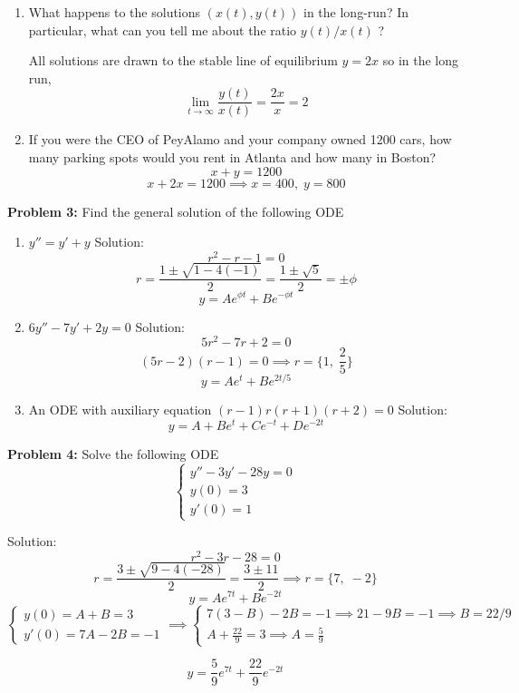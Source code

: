\documentclass[12pt]{article}
\begin{document}
\begin{enumerate}
    \item What happens to the solutions $(x(t), y(t))$ in the long-run? In particular, what can you tell me about the ratio $y(t)/x(t)$ ?
    
    All solutions are drawn to the stable line of equilibrium $y = 2x$ so in the long run,
    \[\lim_{t \to \infty} \frac{y(t)}{x(t)} = \frac{2x}{x} = \boxed{2}\]
    
    \item If you were the CEO of PeyAlamo and your company owned 1200 cars, how many parking spots would you rent in Atlanta and how many in Boston?
    \[x + y = 1200\]
    \[x + 2x = 1200 \implies x = 400, \; y = 800\]
\end{enumerate}

\pagebreak 

\textbf{Problem 3:} Find the general solution of the following ODE
\begin{enumerate}
    \item $y'' = y' + y$
    Solution:
    \[r^2 - r - 1 = 0\]
    \[r = \frac{1 \pm \sqrt{1 - 4(-1)}}{2} = \frac{1 \pm \sqrt{5}}{2} = \pm \phi\]
    \[\boxed{y = Ae^{\phi t} + B e^{-\phi t}}\]

    \item $6y'' - 7y' + 2y = 0$
    Solution:
    \[5r^2 - 7r  +2 = 0\]
    \[(5r - 2)(r - 1) = 0 \implies r = \{1, \; \frac{2}{5}\}\]
    \[\boxed{y = Ae^{t} + Be^{2t/5}}\]
    
    \item An ODE with auxiliary equation $(r - 1)r(r + 1)(r+ 2) = 0$
    Solution:
    \[\boxed{y = A + Be^t + Ce^{-t} + De^{-2t}}\]
\end{enumerate}

\pagebreak 

\textbf{Problem 4:} Solve the following ODE
\[\begin{cases}
    y'' - 3y' - 28y = 0\\
    y(0) = 3\\
    y'(0) = 1
\end{cases}\]

Solution:
\[r^2 - 3r - 28 = 0\]
\[r = \frac{3 \pm \sqrt{9 - 4(-28)}}{2} = \frac{3 \pm 11}{2} \implies r = \{7, \; -2\}\]  
\[y = Ae^{7t} + Be^{-2t}\]
\[\begin{cases}
    y(0) = A + B = 3\\
    y'(0) = 7A - 2B = -1
\end{cases} \implies \begin{cases}
    7(3 - B) - 2B = -1 \implies 21 - 9B = -1 \implies B = 22/9\\
    A + \frac{22}{9} = 3 \implies A = \frac{5}{9}
\end{cases}\]

\[\boxed{y = \frac{5}{9}e^{7t} + \frac{22}{9}e^{-2t}}\]
\end{document}
